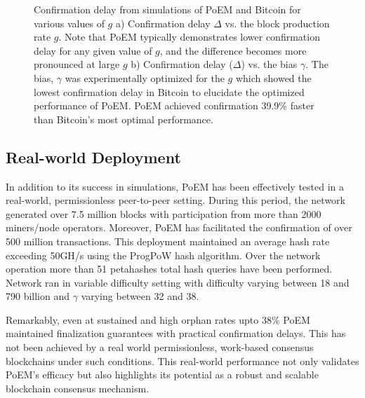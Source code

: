 \begin{figure}
\begin{subfigure}{0.49\textwidth}
    \label{fig:fg}
    \end{subfigure}
    \caption{Confirmation delay from simulations of PoEM and Bitcoin for various values of $g$ a) Confirmation delay $\Delta$ vs. the block production rate $g$. Note that PoEM typically demonstrates lower confirmation delay for any given value of $g$, and the difference becomes more pronounced at large $g$ b) Confirmation delay ($\Delta$) vs. the bias $\gamma$. The bias, $\gamma$ was experimentally optimized for the $g$ which showed the lowest confirmation delay in Bitcoin to elucidate the optimized performance of PoEM. PoEM achieved confirmation 39.9\% faster than Bitcoin's most optimal performance.}
    \label{fig:gamma}
\end{figure}

\subsection{Real-world Deployment}
In addition to
its success in simulations, PoEM has been effectively tested in a real-world,
permissionless peer-to-peer setting. During this
period, the network generated over 7.5 million blocks with participation from
more than 2000 miners/node operators. Moreover, PoEM has facilitated the
confirmation of over 500 million transactions. This deployment maintained an
average hash rate exceeding 50GH/s using the ProgPoW hash algorithm. Over the
network operation more than 51 petahashes total hash queries have been performed.
Network ran in variable difficulty setting with difficulty varying between 18
and 790 billion and $\gamma$ varying between 32 and 38.

Remarkably, even at sustained and high orphan rates upto 38\% PoEM maintained
finalization guarantees with practical confirmation delays. This has not been
achieved by a real world permissionless, work-based consensus blockchains under
such conditions. This real-world performance not only validates PoEM's efficacy
but also highlights its potential as a robust and scalable blockchain consensus
mechanism.
